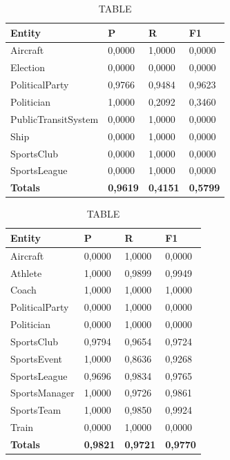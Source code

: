 \documentclass[thesis=M,english]{FITthesis}[2018/05/30]
\begin{document}
	\begin{table}[H]\centering
		\caption{TABLE}
		\label{}
		\begin{tabular}{|l|l|l|l|}
			\hline {\textbf{Entity}} & {\textbf{P}} & {\textbf{R}} & {\textbf{F1}}\\\hline
				Aircraft & 0,0000 & 1,0000 & 0,0000\\				
				Election & 0,0000 & 0,0000 & 0,0000\\
				PoliticalParty & 0,9766 & 0,9484 & 0,9623\\
				Politician & 1,0000 & 0,2092 & 0,3460\\
				PublicTransitSystem & 0,0000 & 1,0000 & 0,0000\\
				Ship & 0,0000 & 1,0000 & 0,0000\\
				SportsClub & 0,0000 & 1,0000 & 0,0000\\
				SportsLeague & 0,0000 & 1,0000 & 0,0000\\\hline
				\textbf{Totals} & \textbf{0,9619} & \textbf{0,4151} & \textbf{0,5799}\\\hline
		\end{tabular}
	\end{table}	

	\begin{table}[H]\centering
		\caption{TABLE}
		\label{}
		\begin{tabular}{|l|l|l|l|}
			\hline {\textbf{Entity}} & {\textbf{P}} & {\textbf{R}} & {\textbf{F1}}\\\hline
				Aircraft & 0,0000 & 1,0000 & 0,0000\\
				Athlete & 1,0000 & 0,9899 & 0,9949\\
				Coach & 1,0000 & 1,0000 & 1,0000\\
				PoliticalParty & 0,0000 & 1,0000 & 0,0000\\
				Politician & 0,0000 & 1,0000 & 0,0000\\
				SportsClub & 0,9794 & 0,9654 & 0,9724\\
				SportsEvent & 1,0000 & 0,8636 & 0,9268\\
				SportsLeague & 0,9696 & 0,9834 & 0,9765\\
				SportsManager & 1,0000 & 0,9726 & 0,9861\\				
				SportsTeam & 1,0000 & 0,9850 & 0,9924\\
				Train & 0,0000 & 1,0000 & 0,0000\\\hline
				\textbf{Totals} & \textbf{0,9821} & \textbf{0,9721} & \textbf{0,9770}\\\hline
		\end{tabular}
	\end{table}	
\end{document}
